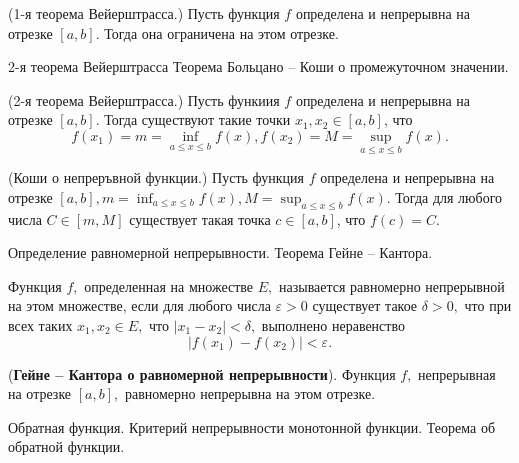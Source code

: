 \begin{theorem}
    (1-я теорема Вейерштрасса.) Пусть функция $f$ определена и непрерывна на отрезке $[a, b]$. Тогда она ограничена на этом отрезке.
\end{theorem}

\newpage
\begin{problem}
2-я теорема Вейерштрасса Теорема Больцано – Коши о промежуточном значении.
\end{problem}
\begin{theorem}
    (2-я теорема Вейерштрасса.) Пусть функиия $f$ определена и непрерывна на отрезке $[a, b]$. Тогда существуют такие точки $x_1, x_2 \in[a, b]$, что
    $$
        f\left(x_1\right)=m=\inf _{a \leq x \leq b} f(x), f\left(x_2\right)=M=\sup _{a \leq x \leq b} f(x) .
    $$
\end{theorem}

\begin{theorem}
    (Коши о непреръвной функции.) Пусть функция $f$ определена и непрерывна на отрезке $[a, b], m=\inf _{a \leq x \leq b} f(x), M=\sup _{a \leq x \leq b} f(x)$. Тогда для любого числа $C \in[m, M]$ существует такая точка $c \in[a, b]$, что $f(c)=C$.
\end{theorem}

\newpage
\begin{problem}
Определение равномерной непрерывности. Теорема Гейне – Кантора.
\end{problem}

\begin{definition}
    Функция $f,$ определенная на множестве $E,$
    называется равномерно непрерывной на этом множестве,
    если для любого числа $\varepsilon>0$ существует
    такое $\delta>0,$ что при всех таких
    $x_1, x_2\in E,$ что $|x_1-x_2|<\delta,$ выполнено
    неравенство
    $$
        |f(x_1)-f(x_2)|<\varepsilon.
    $$
\end{definition}

\begin{theorem}(\textbf{Гейне -- Кантора о равномерной
        непрерывности}).
    Функция $f,$ непрерывная на отрезке $[a, b],$
    равномерно непрерывна на этом отрезке.
\end{theorem}

\newpage
\begin{problem}
Обратная функция. Критерий непрерывности монотонной функции. Теорема об обратной функции.
\end{problem}

